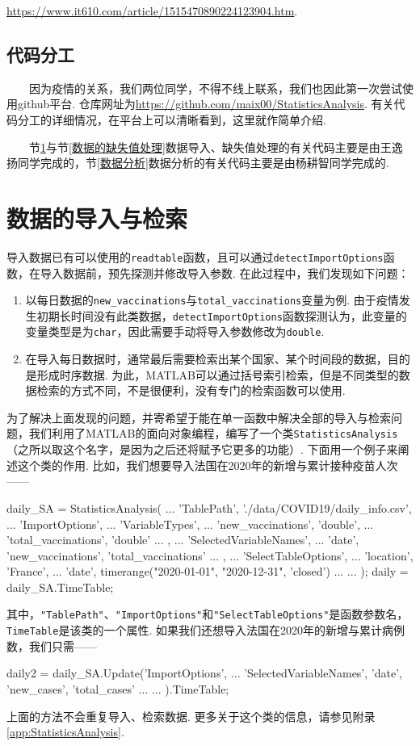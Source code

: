 \documentclass[a4paper, titlepage]{article}
\begin{document}
        \url{https://www.it610.com/article/1515470890224123904.htm}.

        \subsection{代码分工}
        　　因为疫情的关系，我们两位同学，不得不线上联系，我们也因此第一次尝试使用github平台. 仓库网址为\url{https://github.com/maix00/StatisticsAnalysis}. 有关代码分工的详细情况，在平台上可以清晰看到，这里就作简单介绍.

        　　节\ref{数据的导入}与节\ref{数据的缺失值处理}数据导入、缺失值处理的有关代码主要是由王逸扬同学完成的，节\ref{数据分析}数据分析的有关代码主要是由杨耕智同学完成的.

    \section{数据的导入与检索}\label{数据的导入}
        导入数据已有可以使用的\texttt{readtable}函数，且可以通过\texttt{detectImportOptions}函数，在导入数据前，预先探测并修改导入参数. 在此过程中，我们发现如下问题：
        \begin{enumerate}
            \item [1.] 以每日数据的\texttt{new\_vaccinations}与\texttt{total\_vaccinations}变量为例. 由于疫情发生初期长时间没有此类数据，\texttt{detectImportOptions}函数探测认为，此变量的变量类型是为\texttt{char}，因此需要手动将导入参数修改为\texttt{double}.
            \item [2.] 在导入每日数据时，通常最后需要检索出某个国家、某个时间段的数据，目的是形成时序数据. 为此，MATLAB可以通过括号索引检索，但是不同类型的数据检索的方式不同，不是很便利，没有专门的检索函数可以使用.
        \end{enumerate}
        为了解决上面发现的问题，并寄希望于能在单一函数中解决全部的导入与检索问题，我们利用了MATLAB的面向对象编程，编写了一个类\texttt{StatisticsAnalysis}（之所以取这个名字，是因为之后还将赋予它更多的功能）. 下面用一个例子来阐述这个类的作用. 比如，我们想要导入法国在2020年的新增与累计接种疫苗人次——
\begin{matlabcode}
daily_SA = StatisticsAnalysis( ...
    'TablePath', './data/COVID19/daily_info.csv', ...
    'ImportOptions', { ...
        'VariableTypes', { ...
            'new_vaccinations', 'double', ...
            'total_vaccinations', 'double' ...
            }, ...
        'SelectedVariableNames', ...
            {'date', 'new_vaccinations', 'total_vaccinations'} ...
        }, ...
    'SelectTableOptions', { ...
        'location', 'France', ...
        'date', timerange("2020-01-01", "2020-12-31", 'closed') ...
        } ...
    );
daily = daily_SA.TimeTable;
\end{matlabcode}
        其中，\texttt{"TablePath"}、\texttt{"ImportOptions"}和\texttt{"SelectTableOptions"}是函数参数名，\texttt{TimeTable}是该类的一个属性. 如果我们还想导入法国在2020年的新增与累计病例数，我们只需——
\begin{matlabcode}
daily2 = daily_SA.Update('ImportOptions', { ...
        'SelectedVariableNames', {'date', 'new_cases', 'total_cases'} ...
        }...
    ).TimeTable;
\end{matlabcode}
        上面的方法不会重复导入、检索数据. 更多关于这个类的信息，请参见附录\ref{app:StatisticsAnalysis}. 
\end{document}
